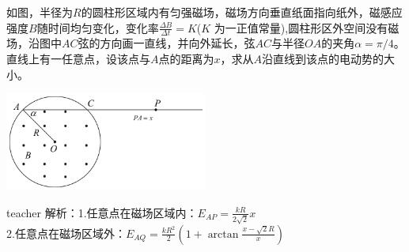 \begin{example}

如图，半径为$R$的圆柱形区域内有匀强磁场，磁场方向垂直纸面指向纸外，磁感应强度$B$随时间均匀变化，变化率$\frac{\Delta B}{\Delta t} = K$($K$ 为一正值常量),圆柱形区外空间没有磁场，沿图中$AC$弦的方向画一直线，并向外延长，弦$AC$与半径$OA$的夹角$\alpha = \pi/4$。
直线上有一任意点，设该点与$A$点的距离为$x$，求从$A$沿直线到该点的电动势的大小。
\begin{flushright}
\includegraphics[width = 0.5\textwidth]{images/mag-23.pdf} 
\end{flushright}
\begin{taggedblock}{teacher}
\noindent
解析：1.任意点在磁场区域内：$E_{AP}=\frac{kR}{2\sqrt{2}}x$
\\2.任意点在磁场区域外：$E_{AQ}=\frac{kR^2}{2}(1+\arctan\frac{x-\sqrt{2}R}{x})$
\end{taggedblock}
\end{example}


